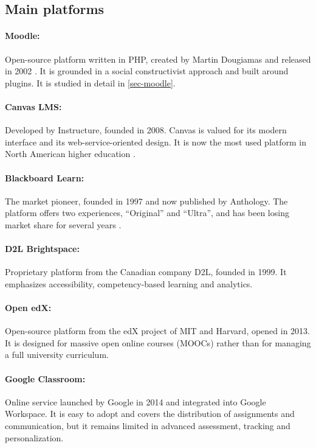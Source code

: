 \subsection{Main platforms}

\paragraph{Moodle:} Open-source platform written in PHP, created by Martin
Dougiamas and released in 2002 \cite{dougiamas2003}. It is grounded in a
social constructivist approach and built around plugins. It is studied in
detail in \cref{sec-moodle}.

\paragraph{Canvas LMS:} Developed by Instructure, founded in 2008. Canvas
is valued for its modern interface and its web-service-oriented design. It
is now the most used platform in North American higher education
\cite{onedtech2024}.

\paragraph{Blackboard Learn:} The market pioneer, founded in 1997 and now
published by Anthology. The platform offers two experiences,
\enquote{Original} and \enquote{Ultra}, and has been losing market share
for several years \cite{edutechnica2025}.

\paragraph{D2L Brightspace:} Proprietary platform from the Canadian
company D2L, founded in 1999. It emphasizes accessibility,
competency-based learning and analytics.

\paragraph{Open edX:} Open-source platform from the edX project of MIT and
Harvard, opened in 2013. It is designed for massive open online courses
(MOOCs) rather than for managing a full university curriculum.

\paragraph{Google Classroom:} Online service launched by Google in 2014
and integrated into Google Workspace. It is easy to adopt and covers the
distribution of assignments and communication, but it remains limited in
advanced assessment, tracking and personalization.

